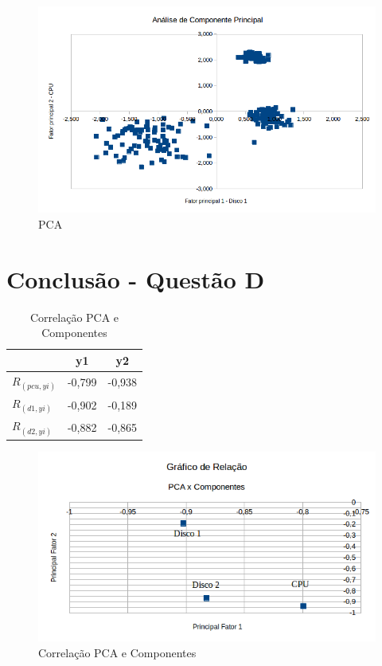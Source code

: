 \documentclass[11pt,a4paper,openany,oneside]{abntex2}
\begin{document}
	\begin{figure}[H]
		\centering%
		\includegraphics[scale=0.60]{pca.png}
		\caption{PCA }
		\label{fig:pca}
	\end{figure}


\chapter{Conclusão - Questão D}
\begin{table}[H]
	\caption{Correlação PCA e Componentes}
	\centering
	\begin{tabular}{|l|c|c|}
		\hline
		\textbf{}     & \textbf{y1} & \textbf{y2} \\ \hline
		$R_{(pcu,yi)}$ & -0,799       & -0,938 \\ \hline
		$R_{(d1,yi)}$  & -0,902       & -0,189 \\ \hline
		$R_{(d2,yi)}$  & -0,882       & -0,865 \\ \hline
	\end{tabular}
	\label{pcaconponentes}
\end{table}

	\begin{figure}[H]
		\centering%
		\includegraphics[scale=0.80]{relacao.png}
		\caption{Correlação PCA e Componentes}
		\label{fig:pcacomp}
	\end{figure}
\end{document}
